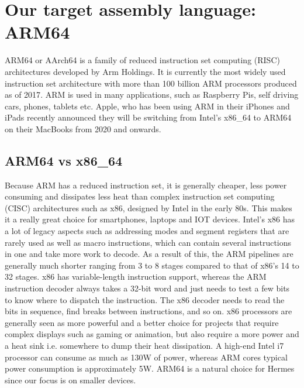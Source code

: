 \section{Our target assembly language: ARM64}
ARM64 or AArch64 is a family of reduced instruction set computing (RISC) architectures developed by Arm Holdings.
It is currently the most widely used instruction set architecture with more than 100 billion ARM processors produced as of 2017\cite{ARM_sales}. 
ARM is used in many applications, such as Raspberry Pis, self driving cars, phones, tablets etc. Apple, who has been using ARM in their iPhones and iPads recently announced they will be switching from Intel's x86\_64 to ARM64 on their MacBooks from 2020 and onwards\cite{ARM_cpus_2020}.

\subsection{ARM64 vs x86\_64}
Because ARM has a reduced instruction set, it is generally cheaper, less power consuming and dissipates less heat than complex instruction set computing (CISC) architectures such as x86, designed by Intel in the early 80s. This makes it a really great choice for smartphones, laptops and IOT devices.
Intel's x86 has a lot of legacy aspects such as addressing modes and segment registers that are rarely used as well as macro instructions, which can contain several instructions in one and take more work to decode. As a result of this, the ARM pipelines are generally much shorter ranging from 3 to 8 stages compared to that of x86's 14 to 32 stages.  
x86 has variable-length instruction support, whereas the ARM instruction decoder always takes a 32-bit word and just needs to test a few bits to know where to dispatch the instruction. The x86 decoder needs to read the bits in sequence, find breaks between instructions, and so on.  
x86 processors are generally seen as more powerful and a better choice for projects that require complex displays such as gaming or animation, but also require a more power and a heat sink i.e. somewhere to dump their heat dissipation. A high-end Intel i7 processor can consume as much as 130W of power, whereas ARM cores typical power consumption is approximately 5W.
ARM64 is a natural choice for Hermes since our focus is on smaller devices.
